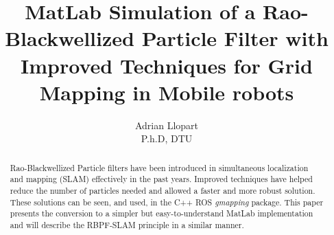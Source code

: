 \documentclass[letterpaper]{article}
\begin{document}
\title{MatLab Simulation of a Rao-Blackwellized Particle Filter with Improved Techniques for Grid Mapping in Mobile robots}
\author{Adrian Llopart \\ P.h.D, DTU }
\maketitle


\begin{abstract}

Rao-Blackwellized Particle filters have been introduced in simultaneous localization and mapping (SLAM) effectively in the past years. Improved techniques have helped reduce the number of particles needed and allowed a faster and more robust solution. These solutions can be seen, and used, in the C++ ROS \textit{gmapping} package. This paper presents the conversion to a simpler but easy-to-understand MatLab implementation and will describe the RBPF-SLAM principle in a similar manner.

\end{abstract}
\end{document}
